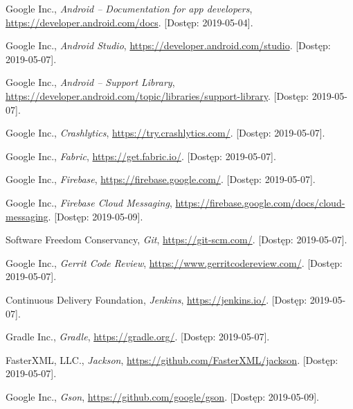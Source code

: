 \documentclass{pracamgr}
\begin{document}
\begin{thebibliography}{99}


 Google Inc., \textit{Android -- Documentation for app developers},
	 \url{https://developer.android.com/docs}. [Dostęp: 2019-05-04].

 Google Inc., \textit{Android Studio},
	\url{https://developer.android.com/studio}. [Dostęp: 2019-05-07].

 Google Inc., \textit{Android -- Support Library},
	\url{https://developer.android.com/topic/libraries/support-library}. [Dostęp: 2019-05-07].

 Google Inc., \textit{Crashlytics}, \url{https://try.crashlytics.com/}. [Dostęp: 2019-05-07].

 Google Inc., \textit{Fabric}, \url{https://get.fabric.io/}. [Dostęp: 2019-05-07].

 Google Inc., \textit{Firebase}, \url{https://firebase.google.com/}. [Dostęp: 2019-05-07].

 Google Inc., \textit{Firebase Cloud Messaging},
	\url{https://firebase.google.com/docs/cloud-messaging}. [Dostęp: 2019-05-09].

 Software Freedom Conservancy, \textit{Git},
	\url{https://git-scm.com/}. [Dostęp: 2019-05-07].

 Google Inc., \textit{Gerrit Code Review},
	\url{https://www.gerritcodereview.com/}. [Dostęp: 2019-05-07].

 Continuous Delivery Foundation, \textit{Jenkins},
	\url{https://jenkins.io/}. [Dostęp: 2019-05-07].

 Gradle Inc., \textit{Gradle}, \url{https://gradle.org/}. [Dostęp: 2019-05-07].

 FasterXML, LLC., \textit{Jackson},
	\url{https://github.com/FasterXML/jackson}. [Dostęp: 2019-05-07].

 Google Inc., \textit{Gson},	\url{https://github.com/google/gson}. [Dostęp: 2019-05-09].


\end{thebibliography}
\end{document}
